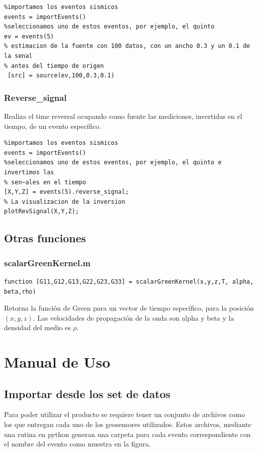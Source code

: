 \begin{verbatim}
%importamos los eventos sismicos
events = importEvents()
%seleccionamos uno de estos eventos, por ejemplo, el quinto
ev = events(5)
% estimacion de la fuente con 100 datos, con un ancho 0.3 y un 0.1 de la senal
% antes del tiempo de origen
 [src] = source(ev,100,0.3,0.1)
\end{verbatim}

\subsubsection{Reverse\_signal}
Realiza el time reversal ocupando como fuente las mediciones, invertidas en
el tiempo, de un evento específico.
\begin{verbatim}
%importamos los eventos sismicos
events = importEvents()
%seleccionamos uno de estos eventos, por ejemplo, el quinto e invertimos las
% sen~ales en el tiempo
[X,Y,Z] = events(5).reverse_signal;
% La visualizacion de la inversion
plotRevSignal(X,Y,Z);
\end{verbatim}

\subsection{Otras funciones}
\subsubsection{scalarGreenKernel.m}
\begin{verbatim}
function [G11,G12,G13,G22,G23,G33] = scalarGreenKernel(x,y,z,T, alpha, beta,rho)
\end{verbatim}
Retorna la función de Green para un vector de tiempo específico, para la
posici\'on $(x,y,z)$. Las velocidades de propagación de la onda son alpha y beta
y la densidad del medio es $\rho$.

\section{Manual de Uso}
\subsection{Importar desde los set de datos}
Para poder utilizar el producto se requiere tener un conjunto de archivos como 
los que entregan cada uno de los geosensores utilizados. Estos archivos,
mediante una rutina en python generan una carpeta para cada evento correspondiente con el 
nombre del evento como muestra en la figura.

